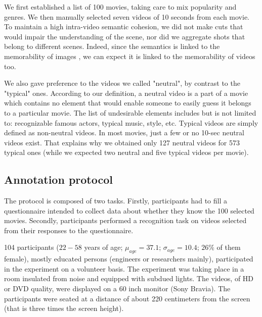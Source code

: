 \documentclass[sigconf]{acmart}
\begin{document}
We first established a list of 100 movies, taking care to mix popularity and genres.
We then manually selected seven videos of 10 seconds from each movie.
To maintain a high intra-video semantic cohesion, we did not make cuts that would impair the understanding of the scene, nor did we aggregate shots that belong to different scenes.
Indeed, since the semantics is linked to the memorability of images \cite{isola_2014_makes}, we can expect it is linked to the memorability of videos too.

We also gave preference to the videos we called "neutral", by contrast to the "typical" ones.
According to our definition, a neutral video is a part of a movie which contains no element that would enable someone to easily guess it belongs to a particular movie.
The list of undesirable elements includes but is not limited to: recognizable famous actors, typical music, style, etc.
Typical videos are simply defined as non-neutral videos.
In most movies, just a few or no 10-sec neutral videos exist.
That explains why we obtained only 127 neutral videos for 573 typical ones (while we expected two neutral and five typical videos per movie).
 
\subsection{Annotation protocol}
The protocol is composed of two tasks.
Firstly, participants had to fill a questionnaire intended to collect data about whether they know the 100 selected movies.
Secondly, participants performed a recognition task on videos selected from their responses to the questionnaire.

104 participants ($22-58$ years of age; $\mu_{age}=37.1 $; $\sigma_{age}=10.4$; $26\%$ of them female), mostly educated persons (engineers or researchers mainly), participated in the experiment on a volunteer basis.
The experiment was taking place in a room insulated from noise and equipped with subdued lights.
The videos, of HD or DVD quality, were displayed on a 60 inch monitor (Sony Bravia).
The participants were seated at a distance of about 220 centimeters from the screen (that is three times the screen height).
\end{document}
